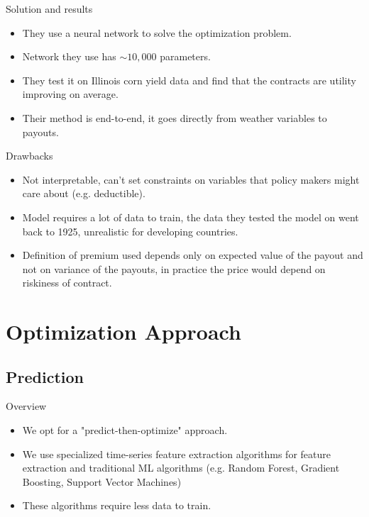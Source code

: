 \documentclass{beamer}
\begin{document}
\begin{frame}{Solution and results}
    \begin{itemize}
       \setlength\itemsep{2em}
        \item They use a neural network to solve the optimization problem. 
        \item Network they use has $\sim 10,000$ parameters. 
        \item They test it on Illinois corn yield data and find that the contracts are utility improving on average.  
        \item Their method is end-to-end, it goes directly from weather variables to payouts. 
    \end{itemize}    
    \end{frame}

\begin{frame}{Drawbacks}
    \begin{itemize}
        \setlength\itemsep{2em}
        \item Not interpretable, can't set constraints on variables that policy makers might care about (e.g. deductible).
        \item Model requires a lot of data to train, the data they tested the model on went back to 1925, unrealistic for developing countries. 
        \item Definition of premium used depends only on expected value of the payout and not on variance of the payouts, in practice the price would depend on riskiness of contract. 
    \end{itemize}    
    \end{frame}

\section{Optimization Approach}

\subsection{Prediction}
\begin{frame}{Overview}
    \begin{itemize}
        \setlength\itemsep{2em}
        \item We opt for a "predict-then-optimize" approach.
        \item We use specialized time-series feature extraction algorithms for feature extraction and traditional ML algorithms (e.g. Random Forest, Gradient Boosting, Support Vector Machines)
        \item These algorithms require less data to train.
    \end{itemize}
\end{frame}
\end{document}
